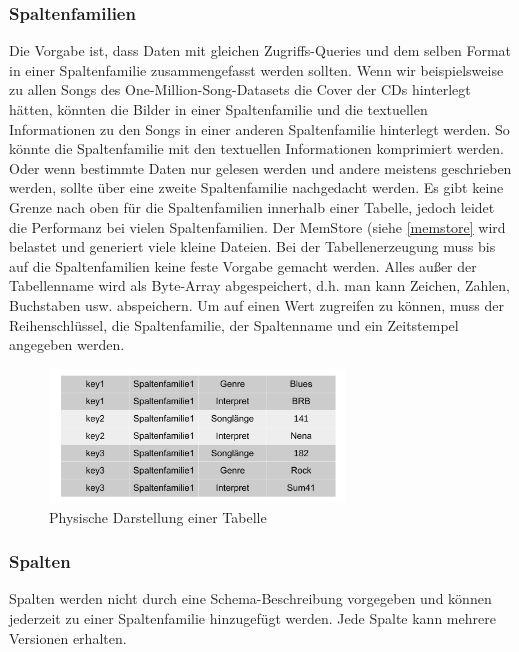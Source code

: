 \subsubsection{Spaltenfamilien}\label{sf}
Die Vorgabe ist, dass Daten mit gleichen Zugriffs-Queries und dem selben Format in einer Spaltenfamilie zusammengefasst werden sollten. Wenn wir beispielsweise zu allen Songs des One-Million-Song-Datasets die Cover der CDs hinterlegt hätten, könnten die Bilder in einer Spaltenfamilie und die textuellen Informationen zu den Songs in einer anderen Spaltenfamilie hinterlegt werden. So könnte die Spaltenfamilie mit den textuellen Informationen komprimiert werden. Oder wenn bestimmte Daten nur gelesen werden und andere meistens geschrieben werden, sollte über eine zweite Spaltenfamilie nachgedacht werden. Es gibt keine Grenze nach oben für die Spaltenfamilien innerhalb einer Tabelle, jedoch leidet die Performanz bei vielen Spaltenfamilien. Der MemStore (siehe \ref{memstore} wird belastet und generiert viele kleine Dateien. Bei der Tabellenerzeugung  muss bis auf die Spaltenfamilien keine feste Vorgabe gemacht werden. Alles außer der Tabellenname wird als Byte-Array abgespeichert, d.h. man kann Zeichen, Zahlen, Buchstaben usw. abspeichern. Um auf einen Wert zugreifen zu können, muss der Reihenschlüssel, die Spaltenfamilie, der Spaltenname und ein Zeitstempel angegeben werden.

\begin{figure}[htbp] 
  \centering
     \includegraphics[width=0.7\textwidth]{images/physisch.pdf}
  \caption{Physische Darstellung einer Tabelle}
  \label{fig:Physische Darstellung einer Tabelle}
\end{figure}



\subsubsection{Spalten}
Spalten werden nicht durch eine Schema-Beschreibung vorgegeben und können jederzeit zu einer Spaltenfamilie hinzugefügt werden. Jede Spalte kann mehrere Versionen erhalten. 

